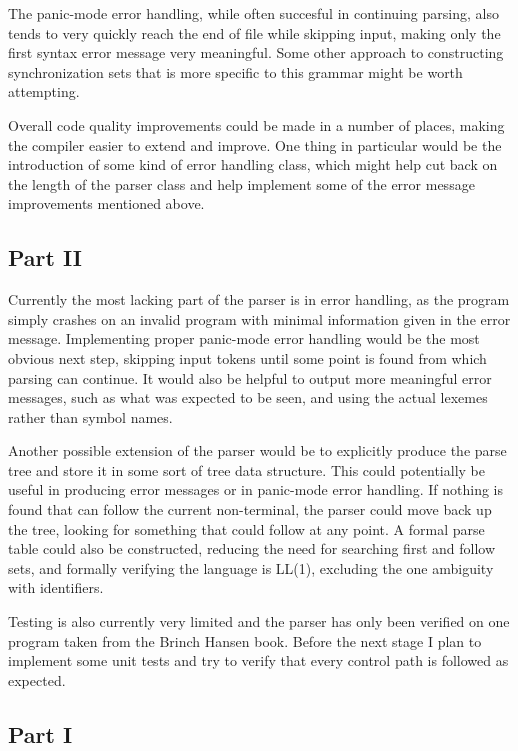 \documentclass{article}
\begin{document}
        The panic-mode error handling, while often succesful in continuing parsing, also tends to very quickly reach the end of file while skipping input, making only the first syntax error message very meaningful. Some other approach to constructing synchronization sets that is more specific to this grammar might be worth attempting. 

        Overall code quality improvements could be made in a number of places, making the compiler easier to extend and improve. One thing in particular would be the introduction of some kind of error handling class, which might help cut back on the length of the parser class and help implement some of the error message improvements mentioned above.

        \subsection{Part II}

        Currently the most lacking part of the parser is in error handling, as the program simply crashes on an invalid program with minimal information given in the error message. Implementing proper panic-mode error handling would be the most obvious next step, skipping input tokens until some point is found from which parsing can continue. It would also be helpful to output more meaningful error messages, such as what was expected to be seen, and using the actual lexemes rather than symbol names. 

        Another possible extension of the parser would be to explicitly produce the parse tree and store it in some sort of tree data structure. This could potentially be useful in producing error messages or in panic-mode error handling. If nothing is found that can follow the current non-terminal, the parser could move back up the tree, looking for something that could follow at any point. A formal parse table could also be constructed, reducing the need for searching first and follow sets, and formally verifying the language is LL(1), excluding the one ambiguity with identifiers.

        Testing is also currently very limited and the parser has only been verified on one program taken from the Brinch Hansen book. Before the next stage I plan to implement some unit tests and try to verify that every control path is followed as expected. 

        \subsection{Part I}
\end{document}
